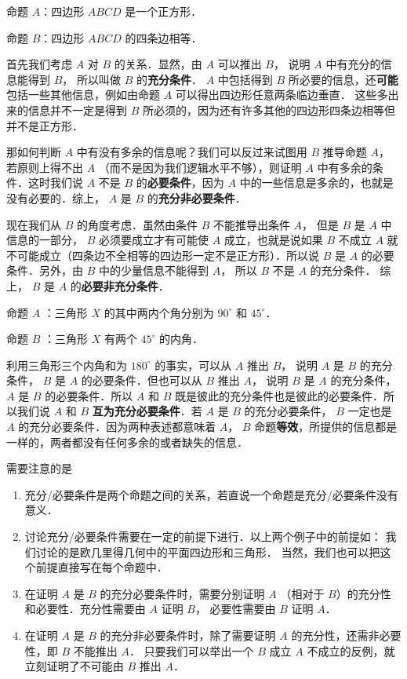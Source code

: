 \begin{example}{}
命题 $A$：四边形 $ABCD$ 是一个正方形．

命题 $B$：四边形 $ABCD$ 的四条边相等．

首先我们考虑 $A$ 对 $B$ 的关系．显然，由 $A$ 可以推出 $B$， 说明 $A$ 中有充分的信息能得到 $B$， 所以叫做 $B$ 的\textbf{充分条件}． $A$ 中包括得到 $B$ 所必要的信息，还\textbf{可能}包括一些其他信息，例如由命题 $A$ 可以得出四边形任意两条临边垂直． 这些多出来的信息并不一定是得到 $B$ 所必须的，因为还有许多其他的四边形四条边相等但并不是正方形．

那如何判断 $A$ 中有没有多余的信息呢？我们可以反过来试图用 $B$ 推导命题 $A$， 若原则上得不出 $A$ （而不是因为我们逻辑水平不够），则证明 $A$ 中有多余的条件．这时我们说 $A$ 不是 $B$ 的\textbf{必要条件}，因为 $A$ 中的一些信息是多余的，也就是没有必要的．综上， $A$ 是 $B$ 的\textbf{充分非必要条件}．

现在我们从 $B$ 的角度考虑．虽然由条件 $B$ 不能推导出条件 $A$， 但是 $B$ 是 $A$ 中信息的一部分， $B$ 必须要成立才有可能使 $A$ 成立，也就是说如果 $B$ 不成立 $A$ 就不可能成立（四条边不全相等的四边形一定不是正方形）．所以说 $B$ 是 $A$ 的必要条件．另外，由 $B$ 中的少量信息不能得到 $A$， 所以 $B$ 不是 $A$ 的充分条件． 综上， $B$ 是 $A$ 的\textbf{必要非充分条件}．
\end{example}


\begin{example}{}
命题 $A$ ：三角形 $X$ 的其中两内个角分别为 $90^\circ$ 和 $45^\circ$．

命题 $B$ ：三角形 $X$ 有两个 $45^\circ$ 的内角．

利用三角形三个内角和为 $180^\circ$ 的事实，可以从 $A$ 推出 $B$， 说明 $A$ 是 $B$ 的充分条件， $B$ 是 $A$ 的必要条件．但也可以从 $B$ 推出 $A$， 说明 $B$ 是 $A$ 的充分条件， $A$ 是 $B$ 的必要条件．所以 $A$ 和 $B$ 既是彼此的充分条件也是彼此的必要条件．所以我们说 $A$ 和 $B$ \textbf{互为充分必要条件}．若 $A$ 是 $B$ 的充分必要条件， $B$ 一定也是 $A$ 的充分必要条件．因为两种表述都意味着 $A$，  $B$ 命题\textbf{等效}，所提供的信息都是一样的，两者都没有任何多余的或者缺失的信息．
\end{example}

需要注意的是 
\begin{enumerate}
\item 充分/必要条件是两个命题之间的关系，若直说一个命题是充分/必要条件没有意义．
\item 讨论充分/必要条件需要在一定的前提下进行．以上两个例子中的前提如： 我们讨论的是欧几里得几何中的平面四边形和三角形． 当然，我们也可以把这个前提直接写在每个命题中．
\item 在证明 $A$ 是 $B$ 的充分必要条件时，需要分别证明 $A$ （相对于 $B$）的充分性和必要性．充分性需要由 $A$ 证明 $B$， 必要性需要由 $B$ 证明 $A$． 
\item 在证明 $A$ 是 $B$ 的充分非必要条件时，除了需要证明 $A$ 的充分性，还需非必要性，即 $B$ 不能推出 $A$． 只要我们可以举出一个 $B$ 成立 $A$ 不成立的反例，就立刻证明了不可能由 $B$ 推出 $A$． 
\end{enumerate}

